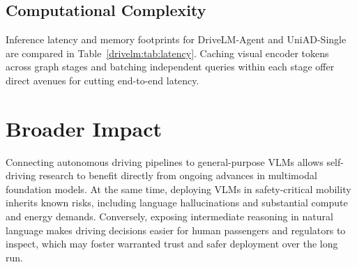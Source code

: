 \subsection{Computational Complexity}\label{drivelm:app:complexity}

Inference latency and memory footprints for DriveLM-Agent and UniAD-Single are compared in Table~\ref{drivelm:tab:latency}. Caching visual encoder tokens across graph stages and batching independent queries within each stage offer direct avenues for cutting end-to-end latency.

\section{Broader Impact}\label{drivelm:app:impact}

Connecting autonomous driving pipelines to general-purpose VLMs allows self-driving research to benefit directly from ongoing advances in multimodal foundation models. At the same time, deploying VLMs in safety-critical mobility inherits known risks, including language hallucinations and substantial compute and energy demands. Conversely, exposing intermediate reasoning in natural language makes driving decisions easier for human passengers and regulators to inspect, which may foster warranted trust and safer deployment over the long run.
